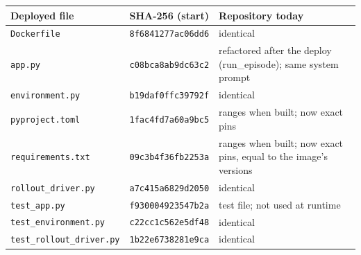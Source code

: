 \documentclass[11pt]{article}
\begin{document}
\begin{center}
\begin{minipage}{\linewidth}\centering
{}
\begin{tabular}{P{4.4cm}lP{8.2cm}}
\toprule
\textbf{Deployed file} & \textbf{SHA-256 (start)} & \textbf{Repository today} \\
\midrule
\texttt{Dockerfile} & \texttt{8f6841277ac06dd6} & identical \\
\texttt{app.py} & \texttt{c08bca8ab9dc63c2} & refactored after the deploy (run\_episode); same system prompt \\
\texttt{environment.py} & \texttt{b19daf0ffc39792f} & identical \\
\texttt{pyproject.toml} & \texttt{1fac4fd7a60a9bc5} & ranges when built; now exact pins \\
\texttt{requirements.txt} & \texttt{09c3b4f36fb2253a} & ranges when built; now exact pins, equal to the image's versions \\
\texttt{rollout\_driver.py} & \texttt{a7c415a6829d2050} & identical \\
\texttt{test\_app.py} & \texttt{f930004923547b2a} & test file; not used at runtime \\
\texttt{test\_environment.py} & \texttt{c22cc1c562e5df48} & identical \\
\texttt{test\_rollout\_driver.py} & \texttt{1b22e6738281e9ca} & identical \\
\bottomrule
\end{tabular}
\end{minipage}
\end{center}
\end{document}
